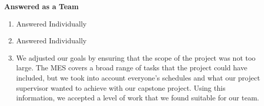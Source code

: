\documentclass{article}
\begin{document}
\textbf{Answered as a Team} 
\begin{enumerate}
\item Answered Individually 
\item Answered Individually
\item We adjusted our goals by ensuring that the scope of the project was not too large. The MES covers a broad range of tasks that the project could have included, but we took into account everyone’s schedules and what our project supervisor wanted to achieve with our capstone project. Using this information, we accepted a level of work that we found suitable for our team.

\end{enumerate}  
\end{document}
